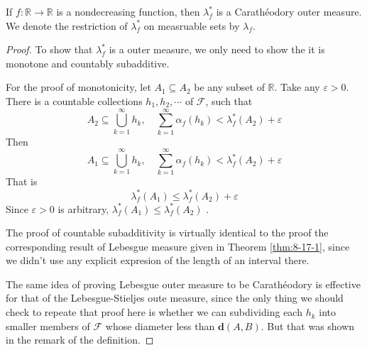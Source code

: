 \documentclass[../main.tex]{subfiles}
\begin{document}
\begin{theorem}{}{}
    If \(  f:\mathbb{R} \to \mathbb{R}   \) is a nondecreasing function, then \(   \lambda _{f}^{*}  \) is a Carath\'eodory outer measure.  We denote the restriction of \(   \lambda _{f}^{*}  \) on measruable sets by \(   \lambda _{f}  \).  
\end{theorem}
\begin{proof}
    To show that \(   \lambda _{f}^{*}  \) is a outer measure, we only need to show the it is monotone and countably subadditive. 

    For the proof of monotonicity, let \(  A_1\subseteq A_2  \) be any subset of \(  \mathbb{R}   \). Take any \(   \varepsilon > 0  \). There is a countable collections \(  h_1,h_2,\cdots   \) of \(  \mathcal{F}  \), such that   \[
    A_2\subseteq \bigcup _{k = 1}^{\infty}h_{k},\quad \sum _{k = 1}^{\infty}\alpha _{f}\left( h_{k} \right)<  \lambda ^{*}_{f}\left( A_2 \right)+  \varepsilon   
    \] Then \[
    A_1\subseteq \bigcup _{k = 1}^{\infty}h_{k},\quad \sum _{k = 1}^{\infty}\alpha _{f}\left( h_{k} \right)<  \lambda _{f}^{*}\left( A_2 \right)+  \varepsilon   
    \]That is \[
     \lambda _{f}^{*}\left( A_1 \right) \le  \lambda _{f}^{*}\left( A_2 \right)+  \varepsilon  
    \]Since \(   \varepsilon > 0  \) is arbitrary, \(   \lambda _{f}^{*}\left( A_1 \right)\le  \lambda _{f}^{*}\left( A_2 \right)    \)  .

    The proof of countable subadditivity is virtually identical to the proof the corresponding result of Lebesgue measure given in Theorem  \ref{thm:8-17-1}, since we didn't use any explicit expresion of the length of an interval there.

    The same idea of proving Lebesgue outer measure to be Carathéodory is effective for that of the Lebesgue-Stieljes oute measure, since the only thing we should check to repeate that proof here is whether we can subdividing each \(  h_{k}  \) into smaller members of \(  \mathcal{F}  \) whose diameter less than \(  \mathbf{d}\left( A,B \right)   \). But that was shown in the remark of the definition.   
\end{proof}
\end{document}

